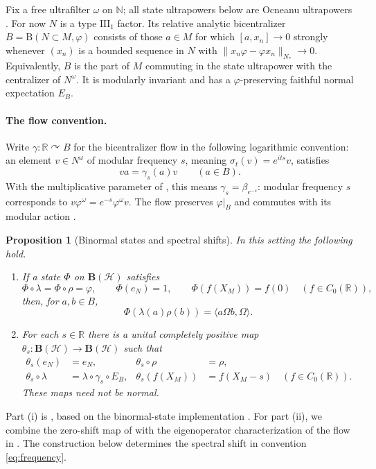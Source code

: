\documentclass[11pt]{article}
\newtheorem{proposition}[theorem]{Proposition}
\theoremstyle{definition}
\newcommand{\B}{\mathrm B}
\newcommand{\R}{\mathbb R}
\newcommand{\HH}{\mathcal H}
\begin{document}
Fix a free ultrafilter $\omega$ on $\mathbb N$; all state ultrapowers below
are Ocneanu ultrapowers \cite{AndoHaagerup2014}. For now $N$ is a type
$\mathrm{III}_1$ factor. Its relative analytic
bicentralizer $B=\B(N\subset M,\varphi)$ consists of those $a\in M$ for which
$[a,x_n]\to0$ strongly whenever $(x_n)$ is a bounded sequence in $N$ with
$\|x_n\varphi-\varphi x_n\|_{N_*}\to0$. Equivalently, $B$ is the part of $M$
commuting in the state ultrapower with the centralizer of $N^\omega$.
It is modularly invariant and has a $\varphi$-preserving faithful normal
expectation $E_B$.

\paragraph{The flow convention.}
Write $\gamma:\R\curvearrowright B$ for the bicentralizer flow in the
following logarithmic convention: an element $v\in N^\omega$ of modular
frequency $s$, meaning $\sigma_t(v)=e^{its}v$, satisfies
\begin{equation}\label{eq:frequency}
 va=\gamma_s(a)v\qquad(a\in B).
\end{equation}
With the multiplicative parameter of \cite{AHHM}, this means
$\gamma_s=\beta_{e^{-s}}$: modular frequency $s$ corresponds to
$v\varphi^\omega=e^{-s}\varphi^\omega v$.
The flow preserves $\varphi|_B$ and commutes with its modular action
\cite{AHHM,M1}.

\begin{proposition}[Binormal states and spectral shifts]\label{prop:inputs}
In this setting the following hold.
\begin{enumerate}[label=(\roman*)]
\item If a state $\Phi$ on $\mathbf B(\HH)$ satisfies
\[
 \Phi\circ\lambda=\Phi\circ\rho=\varphi,\qquad
 \Phi(e_N)=1,\qquad
 \Phi(f(X_M))=f(0)\quad(f\in C_0(\R)),
\]
then, for $a,b\in B$,
\begin{equation}\label{eq:binormal}
 \Phi(\lambda(a)\rho(b))=\langle a\Omega b,\Omega\rangle.
\end{equation}
\item For each $s\in\R$ there is a unital completely positive map
$\theta_s:\mathbf B(\HH)\to\mathbf B(\HH)$ such that
\begin{align}
 \theta_s(e_N)&=e_N,& \theta_s\circ\rho&=\rho,\label{eq:shift1}\\
 \theta_s\circ\lambda&=\lambda\circ\gamma_s\circ E_B,&
 \theta_s(f(X_M))&=f(X_M-s)\quad(f\in C_0(\R)).\label{eq:shift2}
\end{align}
These maps need not be normal.
\end{enumerate}
\end{proposition}
Part (i) is \cite[Lemma~2.1]{M2}, based on the binormal-state implementation
\cite[Theorem~2.9]{M1}. For part (ii), we combine the zero-shift map of
\cite[Lemma~2.2(1)]{M2} with the eigenoperator characterization of the flow in
\cite[Theorem~A(ii)]{AHHM}. The construction below determines the spectral
shift in convention \eqref{eq:frequency}.
\end{document}
